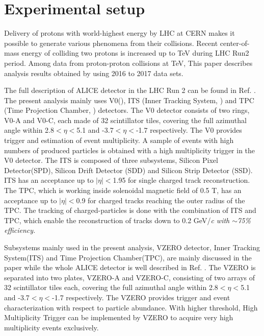 \documentclass[ALICE,manyauthors]{cernphprep}
\begin{document}

\section{Experimental setup}

Delivery of protons with world-highest energy by LHC at CERN makes it possible to generate various phenomena from their collisions. Recent center-of-mass energy of colliding two protons is increased up to \unit[13]{TeV} during LHC Run2 period. Among data from proton-proton collisions at \unit[13]{TeV}, This paper describes analysis results obtained by using 2016 to 2017 data sets.


The full description of ALICE detector in the LHC Run 2 can be found in Ref. \cite{ALICEdet}. The present analysis mainly uses V0(\cite{VZEROpaper}), ITS (Inner Tracking System, \cite{ITSpaper}) and TPC (Time Projection Chamber, \cite{TPCpaper}) detectors. The V0 detector consists of two rings, V0-A and V0-C, each made of 32 scintillator tiles, covering the full azimuthal angle within 2.8$<\eta<$5.1 and -3.7$<\eta<$-1.7 respectively. The V0 provides trigger and estimation of event multiplicity. A sample of events with high numbers of produced particles is obtained with a high multiplicity trigger in the V0 detector. The ITS is composed of three subsystems, Silicon Pixel Detector(SPD), Silicon Drift Detector (SDD) and Silicon Strip Detector (SSD). ITS has an acceptance up to $|\eta|<$1.95 for single charged track reconstruction. The TPC, which is working inside solenoidal magnetic field of 0.5 T, has an acceptance up to $|\eta|<$0.9 for charged tracks reaching the outer radius of the TPC. The tracking of charged-particles is done with the combination of ITS and TPC, which enable the reconstruction of tracks down to 0.2 GeV/\it{c}\rm{} with $\sim$75\% efficiency.

Subsystems mainly used in the present analysis, VZERO detector, Inner Tracking System(ITS) and Time Projection Chamber(TPC), are mainly discussed in the paper while the whole ALICE detector is well described in Ref. \cite{ALICEdet}. The VZERO is separated into two plates, VZERO-A and VZERO-C, consisting of two arrays of 32 scintillator tiles each, covering the full azimuthal angle within 2.8$<\eta<$5.1 and -3.7$<\eta<$-1.7 respectively. The VZERO provides trigger and event characterization with respect to particle abundance. With higher threshold, High Multiplicity Trigger can be implemented by VZERO to acquire very high multiplicity events exclusively.
\end{document}
